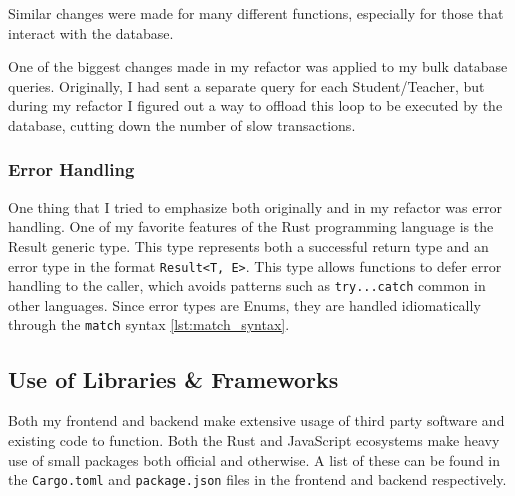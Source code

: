 \documentclass[advisory-ia.tex]{subfiles}
\begin{document}
  

  

  Similar changes were made for many different functions, especially for those that interact with the database.

  One of the biggest changes made in my refactor was applied to my bulk database queries.
  Originally, I had sent a separate query for each Student/Teacher, but during my refactor I figured out a way to offload this loop to be executed by the database, cutting down the number of slow transactions.

  \subsubsection{Error Handling}
  One thing that I tried to emphasize both originally and in my refactor was error handling.
  One of my favorite features of the Rust programming language is the Result generic type.
  This type represents both a successful return type and an error type in the format \texttt{Result<T, E>}.
  This type allows functions to defer error handling to the caller, which avoids patterns such as \texttt{try...catch} common in other languages.
  Since error types are Enums, they are handled idiomatically through the \texttt{match} syntax \cref{lst:match_syntax}.

  

  \subsection{Use of Libraries \& Frameworks}
  Both my frontend and backend make extensive usage of third party software and existing code to function.
  Both the Rust and JavaScript ecosystems make heavy use of small packages both official and otherwise.
  A list of these can be found in the \texttt{Cargo.toml} and \texttt{package.json} files in the frontend and backend respectively.
\end{document}
